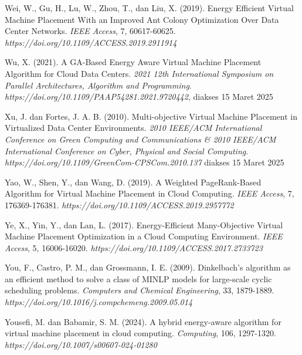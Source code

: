 \begin{thebibliography}{99}
	

	Wei, W., Gu, H., Lu, W., Zhou, T., dan Liu, X. (2019). Energy Efficient Virtual Machine Placement With an Improved Ant Colony Optimization Over Data Center Networks. \textit{IEEE Access}, 7, 60617-60625. \textit{https://doi.org/10.1109/ACCESS.2019.2911914} 
	
	

	Wu, X. (2021). A GA-Based Energy Aware Virtual Machine Placement Algorithm for Cloud Data Centers. \textit{2021 12th International Symposium on Parallel Architectures, Algorithm and Programming}. \textit{https://doi.org/10.1109/PAAP54281.2021.9720442}, diakses 15 Maret 2025
	
	

	Xu, J. dan Fortes, J. A. B. (2010). Multi-objective Virtual Machine Placement in Virtualized Data Center Environments. \textit{2010 IEEE/ACM International Conference on Green Computing and Communications & 2010 IEEE/ACM International Conference on Cyber, Physical and Social Computing}. \textit{https://doi.org/10.1109/GreenCom-CPSCom.2010.137} diakses 15 Maret 2025
	
	

	Yao, W., Shen, Y., dan Wang, D. (2019). A Weighted PageRank-Based Algorithm for Virtual Machine Placement in Cloud Computing. \textit{IEEE Access}, 7, 176369-176381. \textit{https://doi.org/10.1109/ACCESS.2019.2957772}
	
	
  
	Ye, X., Yin, Y., dan Lan, L. (2017). Energy-Efficient Many-Objective Virtual Machine Placement Optimization in a Cloud Computing Environment. \textit{IEEE Access}, 5, 16006-16020. \textit{https://doi.org/10.1109/ACCESS.2017.2733723}
	
	

	You, F., Castro, P. M., dan Grossmann, I. E. (2009). Dinkelbach’s algorithm as an efficient method to solve a class of MINLP models for large-scale cyclic scheduling problems. \textit{Computers and Chemical Engineering}, 33, 1879-1889. \textit{https://doi.org/10.1016/j.compchemeng.2009.05.014}
	
	

	Yousefi, M. dan Babamir, S. M. (2024). A hybrid energy-aware algorithm for virtual machine placement in cloud computing. \textit{Computing}, 106, 1297-1320. \textit{https://doi.org/10.1007/s00607-024-01280}
	

\end{thebibliography}
